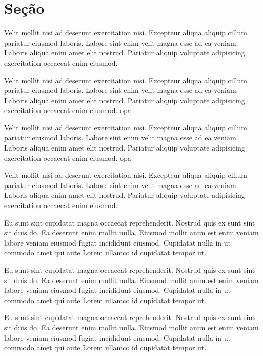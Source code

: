 \documentclass[12pt]{article} %
\begin{document}
\section{Seção}

\singlespacing %
Velit mollit nisi ad deserunt exercitation nisi. Excepteur aliqua aliquip cillum pariatur eiusmod laboris. Labore sint enim velit magna esse ad ea veniam. Laboris aliqua enim amet elit nostrud. Pariatur aliquip voluptate adipisicing exercitation occaecat enim eiusmod.

\onehalfspacing %
Velit mollit nisi ad deserunt exercitation nisi. Excepteur aliqua aliquip cillum pariatur eiusmod laboris. Labore sint enim velit magna esse ad ea veniam. Laboris aliqua enim amet elit nostrud. Pariatur aliquip voluptate adipisicing exercitation occaecat enim eiusmod. opa

\doublespacing %
Velit mollit nisi ad deserunt exercitation nisi. Excepteur aliqua aliquip cillum pariatur eiusmod laboris. Labore sint enim velit magna esse ad ea veniam. Laboris aliqua enim amet elit nostrud. Pariatur aliquip voluptate adipisicing exercitation occaecat enim eiusmod. opa

Velit mollit nisi ad deserunt exercitation nisi. Excepteur aliqua aliquip cillum pariatur eiusmod laboris. Labore sint enim velit magna esse ad ea veniam. Laboris aliqua enim amet elit nostrud. Pariatur aliquip voluptate adipisicing exercitation occaecat enim eiusmod.

\begin{singlespace}
    Eu sunt sint cupidatat magna occaecat reprehenderit. Nostrud quis ex sunt sint sit duis do. Ea deserunt enim mollit nulla. Eiusmod mollit anim est enim veniam labore veniam eiusmod fugiat incididunt eiusmod. Cupidatat nulla in ut commodo amet qui aute Lorem ullamco id cupidatat tempor ut.
\end{singlespace}

\begin{onehalfspace}
    Eu sunt sint cupidatat magna occaecat reprehenderit. Nostrud quis ex sunt sint sit duis do. Ea deserunt enim mollit nulla. Eiusmod mollit anim est enim veniam labore veniam eiusmod fugiat incididunt eiusmod. Cupidatat nulla in ut commodo amet qui aute Lorem ullamco id cupidatat tempor ut.
\end{onehalfspace}

\begin{doublespace}
    Eu sunt sint cupidatat magna occaecat reprehenderit. Nostrud quis ex sunt sint sit duis do. Ea deserunt enim mollit nulla. Eiusmod mollit anim est enim veniam labore veniam eiusmod fugiat incididunt eiusmod. Cupidatat nulla in ut commodo amet qui aute Lorem ullamco id cupidatat tempor ut.
\end{doublespace}
\end{document}
